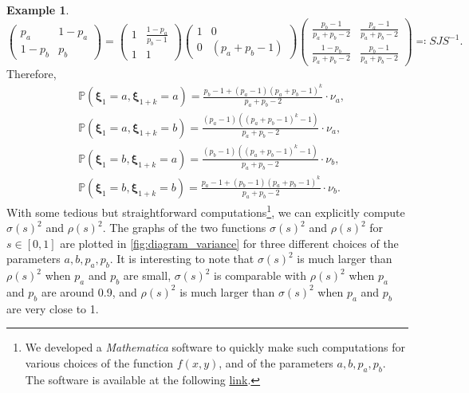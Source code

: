 \documentclass[11pt,a4paper,oneside]{article}
\theoremstyle{definition}
\newtheorem{exmp}[thm]{Example}
\theoremstyle{remark}
\def\P{\mathbb{P}}
\begin{document}
\begin{exmp}
	\begin{equation}
	\begin{pmatrix}
	p_a & 1-p_a \\
	1-p_b & p_b 
	\end{pmatrix}=
	\begin{pmatrix}
	1 & \frac{1-p_a}{p_b-1} \\
	1 & 1
	\end{pmatrix}
	\begin{pmatrix}
	1 & 0 \\
	0 & (p_a+p_b-1)
	\end{pmatrix}
	\begin{pmatrix}
	\frac{p_b-1}{p_a+p_b-2} & \frac{p_a-1}{p_a+p_b-2} \\
	\frac{1-p_b}{p_a+p_b-2} & \frac{p_b-1}{p_a+p_b-2} 
	\end{pmatrix}
	\eqqcolon SJS^{-1}.
	\end{equation}
	Therefore, 
	\begin{align}
	&\P(\bm{\xi}_1=a,\bm{\xi}_{1+k}=a)=\frac{p_b-1 + (p_a-1) (p_a + p_b-1)^k}{p_a + p_b-2}\cdot \nu_a,\\
	&\P(\bm{\xi}_1=a,\bm{\xi}_{1+k}=b)=\frac{(p_a-1) ((p_a + p_b-1)^k-1)}{p_a + p_b-2}\cdot \nu_a,\\
	&\P(\bm{\xi}_1=b,\bm{\xi}_{1+k}=a)=\frac{(p_b-1)((p_a + p_b-1)^k-1)}{p_a + p_b-2}\cdot \nu_b,\\
	&\P(\bm{\xi}_1=b,\bm{\xi}_{1+k}=b)=\frac{p_a-1 + (p_b-1) (p_a + p_b-1)^k}{p_a + p_b-2}\cdot \nu_b.
	\end{align}
	With some tedious but straightforward computations\footnote{We developed a \emph{Mathematica} software to quickly make such computations for various choices of the function $f(x,y)$, and of the parameters $a,b,p_a,p_b$. The software is available at the following \href{https://drive.google.com/drive/folders/1CXZVpe-HJvtJNNGlThu2J-PO9OHme0KP?usp=sharing}{link}.}, we can explicitly compute $\sigma(s)^2$ and $\rho(s)^2$.
	The graphs of the two functions $\sigma(s)^2$ and $\rho(s)^2$ for $s\in[0,1]$ are plotted in \cref{fig:diagram_variance} for three different choices of the parameters $a,b,p_a,p_b$. It is interesting to note that $\sigma(s)^2$ is much larger than $\rho(s)^2$ when $p_a$ and $p_b$ are small, $\sigma(s)^2$ is comparable with $\rho(s)^2$ when $p_a$ and $p_b$ are around 0.9, and $\rho(s)^2$ is much larger than $\sigma(s)^2$ when $p_a$ and $p_b$ are very  close to 1.
	

\end{exmp}
\end{document}
